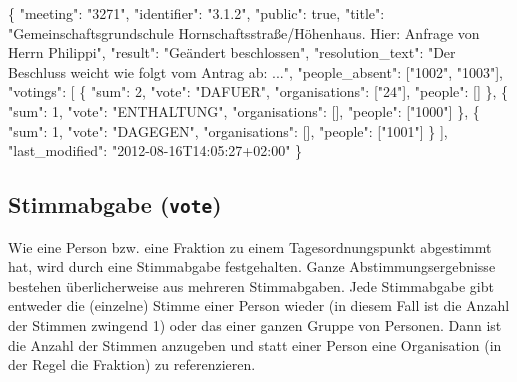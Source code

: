 \documentclass[,a4paper]{article}
\newenvironment{Shaded}{}{}
\newcommand{\DataTypeTok}[1]{\textcolor[rgb]{0.56,0.13,0.00}{{#1}}}
\newcommand{\DecValTok}[1]{\textcolor[rgb]{0.25,0.63,0.44}{{#1}}}
\newcommand{\StringTok}[1]{\textcolor[rgb]{0.25,0.44,0.63}{{#1}}}
\newcommand{\NormalTok}[1]{{#1}}
\begin{document}
\begin{Shaded}
\begin{Highlighting}[]
\NormalTok{\{}
    \DataTypeTok{"meeting"}\NormalTok{: }\StringTok{"3271"}\NormalTok{,}
    \DataTypeTok{"identifier"}\NormalTok{: }\StringTok{"3.1.2"}\NormalTok{,}
    \DataTypeTok{"public"}\NormalTok{: }\DecValTok{true}\NormalTok{,}
    \DataTypeTok{"title"}\NormalTok{: }\StringTok{"Gemeinschaftsgrundschule Hornschaftsstraße/Höhenhaus. Hier: Anfrage von Herrn Philippi"}\NormalTok{,}
    \DataTypeTok{"result"}\NormalTok{: }\StringTok{"Geändert beschlossen"}\NormalTok{,}
    \DataTypeTok{"resolution_text"}\NormalTok{: }\StringTok{"Der Beschluss weicht wie folgt vom Antrag ab: ..."}\NormalTok{,}
    \DataTypeTok{"people_absent"}\NormalTok{: [}\StringTok{"1002"}\NormalTok{, }\StringTok{"1003"}\NormalTok{],}
    \DataTypeTok{"votings"}\NormalTok{: [}
        \NormalTok{\{}
            \DataTypeTok{"sum"}\NormalTok{: }\DecValTok{2}\NormalTok{,}
            \DataTypeTok{"vote"}\NormalTok{: }\StringTok{"DAFUER"}\NormalTok{,}
            \DataTypeTok{"organisations"}\NormalTok{: [}\StringTok{"24"}\NormalTok{],}
            \DataTypeTok{"people"}\NormalTok{: []}
        \NormalTok{\},}
        \NormalTok{\{}
            \DataTypeTok{"sum"}\NormalTok{: }\DecValTok{1}\NormalTok{,}
            \DataTypeTok{"vote"}\NormalTok{: }\StringTok{"ENTHALTUNG"}\NormalTok{,}
            \DataTypeTok{"organisations"}\NormalTok{: [],}
            \DataTypeTok{"people"}\NormalTok{: [}\StringTok{"1000"}\NormalTok{]}
        \NormalTok{\},}
        \NormalTok{\{}
            \DataTypeTok{"sum"}\NormalTok{: }\DecValTok{1}\NormalTok{,}
            \DataTypeTok{"vote"}\NormalTok{: }\StringTok{"DAGEGEN"}\NormalTok{,}
            \DataTypeTok{"organisations"}\NormalTok{: [],}
            \DataTypeTok{"people"}\NormalTok{: [}\StringTok{"1001"}\NormalTok{]}
        \NormalTok{\}}
    \NormalTok{],}
    \DataTypeTok{"last_modified"}\NormalTok{: }\StringTok{"2012-08-16T14:05:27+02:00"}
\NormalTok{\}}
\end{Highlighting}
\end{Shaded}

\subsection{Stimmabgabe (\texttt{vote})}

Wie eine Person bzw. eine Fraktion zu einem Tagesordnungspunkt
abgestimmt hat, wird durch eine Stimmabgabe festgehalten. Ganze
Abstimmungsergebnisse bestehen überlicherweise aus mehreren
Stimmabgaben. Jede Stimmabgabe gibt entweder die (einzelne) Stimme einer
Person wieder (in diesem Fall ist die Anzahl der Stimmen zwingend 1)
oder das einer ganzen Gruppe von Personen. Dann ist die Anzahl der
Stimmen anzugeben und statt einer Person eine Organisation (in der Regel
die Fraktion) zu referenzieren.
\end{document}
